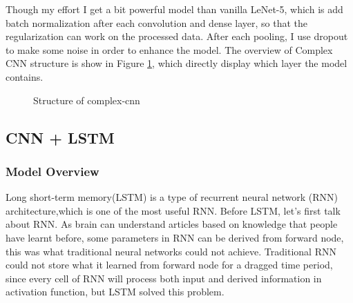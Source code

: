 \documentclass{article}
\begin{document}
Though my effort I get a bit powerful model than vanilla LeNet-5, which is add batch normalization after each convolution and dense layer, so that the regularization can work on the processed data. After each pooling, I use dropout to make some noise in order to enhance the model. The overview of Complex CNN structure is show in Figure \ref{Complex CNN}, which directly display which layer the model contains.
 
\begin{figure}
	\centering
	\caption{Structure of complex-cnn}
	\label{Complex CNN}
\end{figure} 




\subsection{CNN + LSTM}
\subsubsection{Model Overview}
Long short-term memory(LSTM) is a type of recurrent neural network (RNN) architecture,which is one of the most useful RNN.  Before LSTM, let's first talk about RNN. As brain can understand articles based on knowledge that people have learnt before, some parameters in RNN can be derived from forward node, this was what traditional neural networks could not achieve. Traditional RNN could not store what it learned from forward node for a dragged time period, since every cell of RNN will process both input and derived information in activation function, but LSTM solved this problem.
\end{document}
